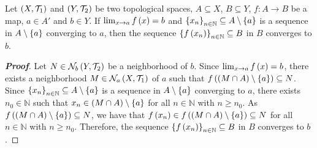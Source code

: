 \begin{proposition}\label{Consequence of limits of maps with respect to sequences convergence}
  Let $\left(X,\mathcal{T}_1\right)$ and $\left(Y,\mathcal{T}_2\right)$ be two topological spaces, $A\subseteq X$, $B\subseteq Y$, $f:A\rightarrow B$ be a map, $a\in A'$ and $b\in Y$. If $\lim_{x\to a}{f\left(x\right)}=b$ and $\left\{x_n\right\}_{n\in\mathbb{N}}\subseteq A\setminus\left\{a\right\}$ is a sequence in $A\setminus\left\{a\right\}$ converging to $a$, then the sequence $\left\{f\left(x_n\right)\right\}_{n\in\mathbb{N}}\subseteq B$ in $B$ converges to $b$.
  \begin{proof}[\rm\textbf{Proof}]
    Let $N\in\mathcal{N}_b\left(Y,\mathcal{T}_2\right)$ be a neighborhood of $b$. Since $\lim_{x\to a}{f\left(x\right)}=b$, there exists a neighborhood $M\in\mathcal{N}_a\left(X,\mathcal{T}_1\right)$ of $a$ such that $f\left(\left(M\cap A\right)\setminus\left\{a\right\}\right)\subseteq N$. Since $\left\{x_n\right\}_{n\in\mathbb{N}}\subseteq A\setminus\left\{a\right\}$ is a sequence in $A\setminus\left\{a\right\}$ converging to $a$, there exists $n_0\in\mathbb{N}$ such that $x_n\in\left(M\cap A\right)\setminus\left\{a\right\}$ for all $n\in\mathbb{N}$ with $n\geq n_0$. As $f\left(\left(M\cap A\right)\setminus\left\{a\right\}\right)\subseteq N$, we have that $f\left(x_n\right)\in f\left(\left(M\cap A\right)\setminus\left\{a\right\}\right)\subseteq N$ for all $n\in\mathbb{N}$ with $n\geq n_0$. Therefore, the sequence $\left\{f\left(x_n\right)\right\}_{n\in\mathbb{N}}\subseteq B$ in $B$ converges to $b$.
  \end{proof}
\end{proposition}

